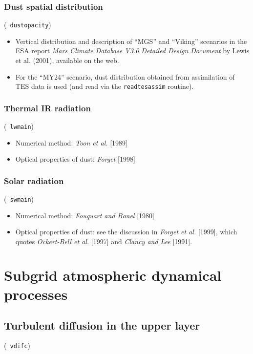 \subsubsection*{Dust spatial distribution}
 (\verb+ dustopacity+)

\begin{itemize}
\item Vertical distribution and description of ``MGS'' and ``Viking'' scenarios
in the ESA report {\it Mars Climate Database V3.0 Detailed Design Document}
by Lewis et al. (2001), available on the web.
\item For the ``MY24'' scenario, dust distribution obtained from assimilation
of TES data is used (and read via the \verb+readtesassim+ routine).
\end{itemize}
\nocite{Forg:99,Lewi:99}

\subsubsection*{Thermal IR radiation}
 (\verb+ lwmain+)
\begin{itemize}
\item Numerical method:  {\it Toon et al.} [1989]
\item Optical properties of dust:  {\it Forget} [1998]
\nocite{Toon:89,Forg:98grl}
\end{itemize}

\subsubsection*{Solar radiation}
 (\verb+ swmain+)
\begin{itemize}
\item Numerical method: {\it Fouquart and Bonel} [1980]
\nocite{Fouq:80}

\item Optical properties of dust:
see the discussion in {\it Forget et al. } [1999], which quotes
 {\it Ockert-Bell et al.} [1997] and {\it Clancy and Lee} [1991].
\nocite{Ocke:97,Clan:91}
\end{itemize}

\section{Subgrid atmospheric dynamical processes}

\subsection{Turbulent diffusion in the upper layer}
 (\verb+ vdifc+)

